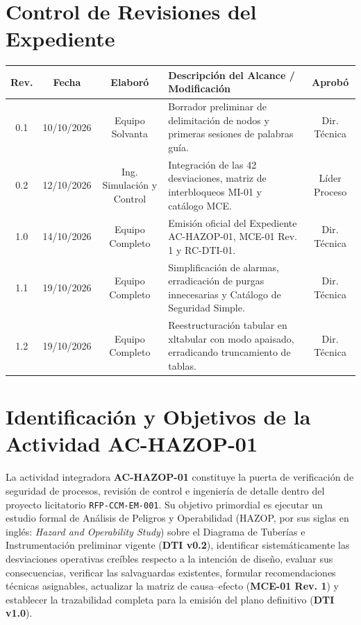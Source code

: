 \documentclass[10pt,letterpaper]{article}
\begin{document}
\section*{Control de Revisiones del Expediente}
\begin{table}[H]
\centering\small
\begin{tabularx}{\textwidth}{c c c X c}
\toprule
\textbf{Rev.} & \textbf{Fecha} & \textbf{Elaboró} & \textbf{Descripción del Alcance / Modificación} & \textbf{Aprobó} \\
\midrule
0.1 & 10/10/2026 & Equipo Solvanta & Borrador preliminar de delimitación de nodos y primeras sesiones de palabras guía. & Dir. Técnica \\
0.2 & 12/10/2026 & Ing. Simulación y Control & Integración de las 42 desviaciones, matriz de interbloqueos MI-01 y catálogo MCE. & Líder Proceso \\
1.0 & 14/10/2026 & Equipo Completo & Emisión oficial del Expediente AC-HAZOP-01, MCE-01 Rev. 1 y RC-DTI-01. & Dir. Técnica \\
1.1 & 19/10/2026 & Equipo Completo & Simplificación de alarmas, erradicación de purgas innecesarias y Catálogo de Seguridad Simple. & Dir. Técnica \\
1.2 & 19/10/2026 & Equipo Completo & Reestructuración tabular en xltabular con modo apaisado, erradicando truncamiento de tablas. & Dir. Técnica \\
\bottomrule
\end{tabularx}
\end{table}
\vspace{0.3cm}
\tableofcontents
\vspace{0.3cm}
\listoftables
\vspace{0.3cm}
\listoffigures
\newpage

\section{Identificación y Objetivos de la Actividad AC-HAZOP-01}
La actividad integradora \textbf{AC-HAZOP-01} constituye la puerta de verificación de seguridad de procesos, revisión de control e ingeniería de detalle dentro del proyecto licitatorio \texttt{RFP-CCM-EM-001}. Su objetivo primordial es ejecutar un estudio formal de Análisis de Peligros y Operabilidad (HAZOP, por sus siglas en inglés: \textit{Hazard and Operability Study}) sobre el Diagrama de Tuberías e Instrumentación preliminar vigente (\textbf{DTI v0.2}), identificar sistemáticamente las desviaciones operativas creíbles respecto a la intención de diseño, evaluar sus consecuencias, verificar las salvaguardas existentes, formular recomendaciones técnicas asignables, actualizar la matriz de causa--efecto (\textbf{MCE-01 Rev. 1}) y establecer la trazabilidad completa para la emisión del plano definitivo (\textbf{DTI v1.0}).
\end{document}

